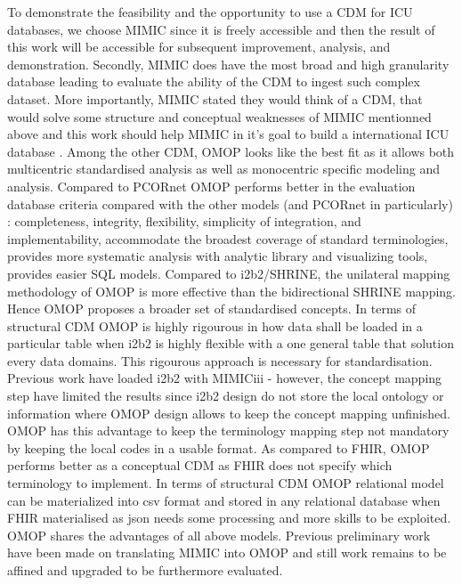 To demonstrate the feasibility and the opportunity to use a CDM for ICU
databases, we choose MIMIC since it is freely accessible and then the result of
this work will be accessible for subsequent improvement, analysis, and
demonstration. Secondly, MIMIC does have the most broad and high granularity
database leading to evaluate the ability of the CDM to ingest such complex
dataset. More importantly, MIMIC stated they would think of a
CDM\cite{mimic-nature}, that would solve some structure and conceptual
weaknesses of MIMIC mentionned above and this work should help MIMIC in it's
goal to build a international ICU database \cite{mimic-i2b2}.
Among the other CDM, OMOP looks like the best fit as it allows both
multicentric standardised analysis as well as monocentric specific modeling and
analysis. 
Compared to PCORnet \cite{omop-vs-pcornet} OMOP performs better in the
evaluation database criteria compared with the other models (and PCORnet in
particularly) : completeness, integrity, flexibility, simplicity of
integration, and implementability, accommodate the broadest coverage of
standard terminologies, provides more systematic analysis with analytic library
and visualizing tools, provides easier SQL models.
Compared to i2b2/SHRINE, the unilateral mapping methodology of OMOP is more
effective than the bidirectional \cite{shrine-design} SHRINE mapping. Hence
OMOP proposes a broader set of standardised concepts. In terms of structural
CDM OMOP is highly rigourous in how data shall be loaded in a particular table
when i2b2 is highly flexible with a one general table that solution every data
domains. This rigourous approach is necessary for standardisation. Previous
work have loaded i2b2 with MIMICiii \cite{mimic-i2b2} - however, the concept
mapping step have limited the results since i2b2 design do not store the local
ontology or information where OMOP design allows to keep the concept mapping
unfinished. OMOP has this advantage to keep the terminology mapping step not
mandatory by keeping the local codes in a usable format.  As compared to FHIR,
OMOP performs better as a conceptual CDM as FHIR does not specify which
terminology to implement. In terms of structural CDM OMOP relational model can
be materialized into csv format and stored in any relational database when FHIR
materialised as json needs some processing and more skills to be exploited.
OMOP shares the advantages of all above models. 
Previous preliminary work have been made on translating MIMIC into OMOP
\cite{mimic-omop-previous} and still work remains to be affined and upgraded to
be furthermore evaluated.


